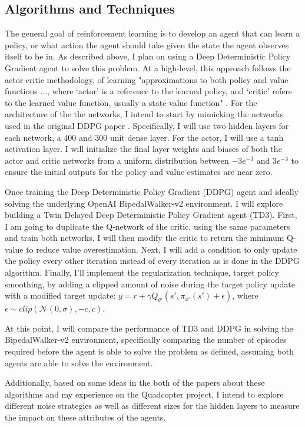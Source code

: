\documentclass{article}
\begin{document}
\subsection{Algorithms and Techniques}
The general goal of reinforcement learning is to develop an agent that can learn a policy, or what action the agent should take given the state the agent observes itself to be in. 
As described above, I plan on using a Deep Deterministic Policy Gradient agent to solve this problem. At a high-level, this approach follows the actor-critic methodology, of learning "approximations to both policy and value functions ..., where ‘actor’ is a reference to the learned policy, and ‘critic’ refers to the learned value function, usually a state-value function" \cite{Sutton:2018:RLI:3312046}. For the architecture of the the networks, I intend to start by mimicking the networks used in the original DDPG paper \cite{DBLP:journals/corr/LillicrapHPHETS15}. Specifically, I will use two hidden layers for each network, a 400 and 300 unit dense layer. For the actor, I will use a tanh activation layer. I will initialize the final layer weights and biases of both the actor and critic networks from a uniform distribution between $-3e^{-3}$ and $3e^{-3}$ to ensure the initial outputs for the policy and value estimates are near zero. 

Once training the Deep Deterministic Policy Gradient (DDPG) agent and ideally solving the underlying OpenAI BipedalWalker-v2 environment. I will explore building a Twin Delayed Deep Deterministic Policy Gradient agent (TD3). First, I am going to duplicate the Q-network of the critic, using the same parameters and train both networks. I will then modify the critic to return the minimum Q-value to reduce value overestimation. Next, I will add a condition to only update the policy every other iteration instead of every iteration as is done in the DDPG algorithm. Finally, I'll implement the regularization technique, target policy smoothing, by adding a clipped amount of noise during the target policy update with a modified target update: $y=r+\gamma Q_{\theta'} (s', \pi_{\phi'}(s')+ \epsilon)$, where $\epsilon \sim clip(\mathcal{N}(0, \sigma), -c, c)$.

At this point, I will compare the performance of TD3 and DDPG in solving the BipedalWalker-v2 environment, specifically comparing the number of episodes required before the agent is able to solve the problem as defined, assuming both agents are able to solve the environment.

Additionally, based on some ideas in the both of the papers about these algorithms and my experience on the Quadcopter project, I intend to explore different noise strategies as well as different sizes for the hidden layers to measure the impact on these attributes of the agents.
\end{document}
